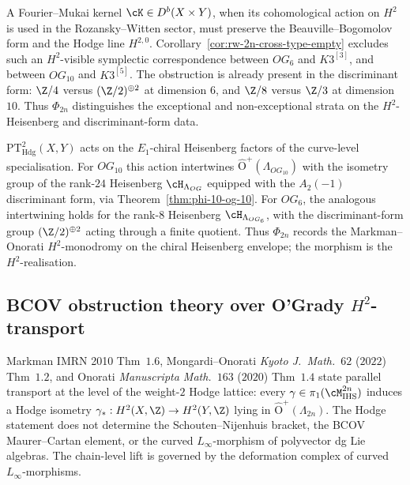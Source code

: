 \begin{remark}
\label{rem:og-k3-fm-kapranov}
A Fourier--Mukai kernel \(\cK\in D^b(X\times Y)\), when its
cohomological action on \(H^2\) is used in the Rozansky--Witten
sector, must preserve the Beauville--Bogomolov form and the Hodge
line \(H^{2,0}\). Corollary~\ref{cor:rw-2n-cross-type-empty}
excludes such an \(H^2\)-visible symplectic correspondence between
\(OG_6\) and \(K3^{[3]}\), and between \(OG_{10}\) and \(K3^{[5]}\).
The obstruction is already present in the discriminant form:
\(\Z/4\) versus \((\Z/2)^{\oplus2}\) at dimension \(6\), and
\(\Z/8\) versus \(\Z/3\) at dimension \(10\). Thus \(\Phi_{2n}\)
distinguishes the exceptional and non-exceptional strata on the
\(H^2\)-Heisenberg and discriminant-form data.
\end{remark}

\begin{remark}
\label{rem:rw-2n-morphism-phi-compatibility}
\(\mathrm{PT}^2_{\mathrm{Hdg}}(X,Y)\) acts on the \(E_1\)-chiral
Heisenberg factors of the curve-level specialisation. For \(OG_{10}\)
this action intertwines
$\widehat{\mathrm{O}}^+(\Lambda_{OG_{10}})$
with the isometry group of the rank-$24$ Heisenberg
$\cH_{\Lambda_{OG}}$ equipped with the $A_2(-1)$ discriminant form, via
Theorem~\ref{thm:phi-10-og-10}. For \(OG_6\), the
analogous intertwining holds for the rank-$8$ Heisenberg
\(\cH_{\Lambda_{OG_6}}\), with the discriminant-form group
\((\Z/2)^{\oplus2}\) acting through a finite quotient.
Thus \(\Phi_{2n}\) records the Markman--Onorati \(H^2\)-monodromy on
the chiral Heisenberg envelope; the morphism is the \(H^2\)-realisation.
\end{remark}

\subsection{BCOV obstruction theory over O'Grady
\texorpdfstring{$H^2$}{H2}-transport}
\label{subsec:chain-level-markman-og}

Markman IMRN 2010 Thm~$1.6$, Mongardi--Onorati \emph{Kyoto J.\
Math.}~$62$ \textup{(}$2022$\textup{)} Thm~$1.2$, and Onorati
\emph{Manuscripta Math.}~$163$ \textup{(}$2020$\textup{)} Thm~$1.4$
state parallel transport at the level of the weight-$2$ Hodge
lattice: every $\gamma \in \pi_1(\cM_{\mathrm{IHS}}^{2n})$ induces a
Hodge isometry $\gamma_*: H^2(X, \Z) \to H^2(Y, \Z)$ lying in
$\widehat{\mathrm{O}}^+(\Lambda_{2n})$. The Hodge statement does not
determine the Schouten--Nijenhuis bracket, the BCOV Maurer--Cartan
element, or the curved \(L_\infty\)-morphism of polyvector dg Lie
algebras. The chain-level lift is governed by the deformation complex
of curved \(L_\infty\)-morphisms.

